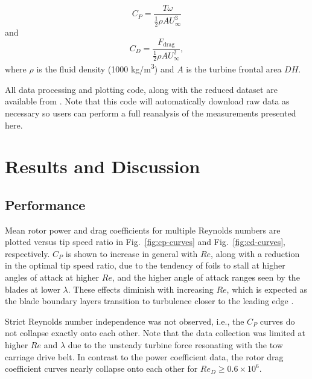 \documentclass[10pt,letterpaper]{article}
\begin{document}
\begin{equation}
    C_P = \frac{T \omega}{\frac{1}{2} \rho A U_\infty^3}
\end{equation}
and
\begin{equation}
    C_D = \frac{F_\mathrm{drag}}{\frac{1}{2} \rho A U_\infty^2},
\end{equation}
where $\rho$ is the fluid density (1000 kg/m\textsuperscript{3}) and $A$ is
the turbine frontal area $DH$.

All data processing and plotting code, along with the reduced dataset are
available from \cite{Bachant2015-RM2-data}. Note that this code will
automatically download raw data as necessary so users can perform a full
reanalysis of the measurements presented here.


\section*{Results and Discussion}

\subsection*{Performance}

Mean rotor power and drag coefficients for multiple Reynolds numbers are plotted
versus tip speed ratio in Fig.~\ref{fig:cp-curves} and Fig.~\ref{fig:cd-curves},
respectively. $C_P$ is shown to increase in general with $Re$, along with a
reduction in the optimal tip speed ratio, due to the tendency of foils to stall
at higher angles of attack at higher $Re$, and the higher angle of attack ranges
seen by the blades at lower $\lambda$. These effects diminish with increasing
$Re$, which is expected as the blade boundary layers transition to turbulence
closer to the leading edge \cite{Lissaman1983, Bachant2015-RVAT-Re-dep}.

Strict Reynolds number independence was not observed, i.e., the $C_P$ curves do
not collapse exactly onto each other. Note that the data collection was limited
at higher $Re$ and $\lambda$ due to the unsteady turbine force resonating with
the tow carriage drive belt. In contrast to the power coefficient data, the
rotor drag coefficient curves nearly collapse onto each other for $Re_D \ge 0.6
\times 10^6$.
\end{document}
